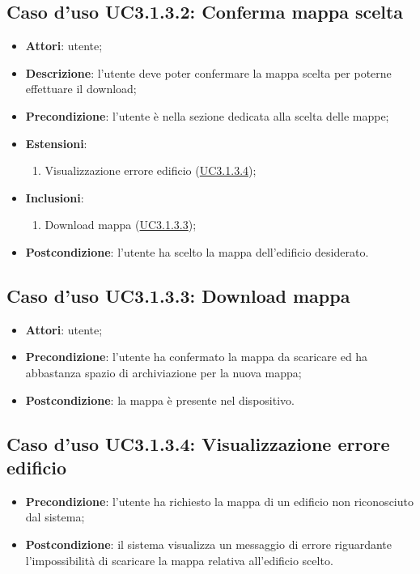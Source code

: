 \documentclass[../AnalisiDeiRequisiti.tex]{subfiles}
\begin{document}
\subsection{Caso d'uso UC3.1.3.2: Conferma mappa scelta}
\begin{itemize}
\item \textbf{Attori}: utente;
\item \textbf{Descrizione}: l'utente deve poter confermare la mappa scelta per poterne effettuare il download; 
      \item \textbf{Precondizione}: l'utente è nella sezione dedicata alla scelta delle mappe;
    \item \textbf{Estensioni}:
      \begin{enumerate}
          \item Visualizzazione errore edificio (\hyperlink{UC3.1.3.4}{UC3.1.3.4});

      \end{enumerate}
    \item \textbf{Inclusioni}:
      \begin{enumerate}
          \item Download mappa (\hyperlink{UC3.1.3.3}{UC3.1.3.3});

      \end{enumerate}
    \item \textbf{Postcondizione}: l'utente ha scelto la mappa dell'edificio desiderato.
  \end{itemize}
\hypertarget{UC3.1.3.3}{}
\subsection{Caso d'uso UC3.1.3.3: Download mappa}
\begin{itemize}
    \item \textbf{Attori}: utente;
    \item \textbf{Precondizione}: l'utente ha confermato la mappa da scaricare ed ha abbastanza spazio di archiviazione per la nuova mappa;
    \item \textbf{Postcondizione}: la mappa è presente nel dispositivo.
  \end{itemize}
\hypertarget{UC3.1.3.4}{}
\subsection{Caso d'uso UC3.1.3.4: Visualizzazione errore edificio}
\begin{itemize}
    \item \textbf{Precondizione}: l'utente ha richiesto la mappa di un edificio non riconosciuto dal sistema;
    \item \textbf{Postcondizione}: il sistema visualizza un messaggio di errore riguardante l'impossibilità di scaricare la mappa relativa all'edificio scelto.
  \end{itemize}
\newpage
\hypertarget{UC3.2}{}
\end{document}
